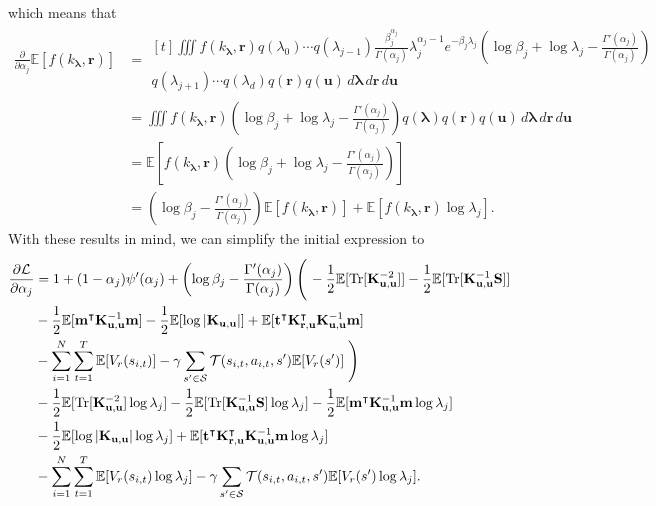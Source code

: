 \documentclass{article}
\theoremstyle{definition}
\DeclareMathOperator{\Tr}{Tr}
\newcommand{\Kuu}{\mathbf{K}_{\mathbf{u},\mathbf{u}}}
\newcommand{\Kru}{\mathbf{K}_{\mathbf{r},\mathbf{u}}}
\newcommand{\da}{\frac{\partial}{\partial\alpha_j}}
\begin{document}
which means that
\[
  \begin{split}
    \da\mathbb{E}[f(k_{\bm\lambda}, \mathbf{r})] &= \!\begin{multlined}[t]
      \iiint f(k_{\bm\lambda}, \mathbf{r}) q(\lambda_0) \cdots q(\lambda_{j-1})
      \frac{\beta_j^{\alpha_j}}{\Gamma(\alpha_j)}\lambda_j^{\alpha_j -
        1}e^{-\beta_j\lambda_j} \left(\log\beta_j + \log\lambda_j -
        \frac{\Gamma'(\alpha_j)}{\Gamma(\alpha_j)} \right) \\
      q(\lambda_{j+1}) \cdots q(\lambda_d)
      q(\mathbf{r})q(\mathbf{u})\,d\bm\lambda\,d\mathbf{r}\,d\mathbf{u}
    \end{multlined} \\
    &= \iiint f(k_{\bm\lambda}, \mathbf{r}) \left(\log\beta_j + \log\lambda_j -
      \frac{\Gamma'(\alpha_j)}{\Gamma(\alpha_j)} \right) q(\bm\lambda)
    q(\mathbf{r})q(\mathbf{u})\,d\bm\lambda\,d\mathbf{r}\,d\mathbf{u} \\
    &= \mathbb{E} \left[ f(k_{\bm\lambda}, \mathbf{r}) \left(\log\beta_j +
        \log\lambda_j - \frac{\Gamma'(\alpha_j)}{\Gamma(\alpha_j)} \right)
    \right] \\
    &= \left( \log\beta_j - \frac{\Gamma'(\alpha_j)}{\Gamma(\alpha_j)}
    \right)\mathbb{E}[f(k_{\bm\lambda}, \mathbf{r})] +
    \mathbb{E}[f(k_{\bm\lambda}, \mathbf{r})\log\lambda_j].
  \end{split}
\]
With these results in mind, we can simplify the initial expression to
\[
  \begin{split}
    \frac{\partial\mathcal{L}}{\partial\alpha_j} &= 1 + (1 -
    \alpha_j)\psi'(\alpha_j) + \left( \log\beta_j -
      \frac{\Gamma'(\alpha_j)}{\Gamma(\alpha_j)} \right)
    \left(\vphantom{\sum_{i=1}^N} \right. - \frac{1}{2}
    \mathbb{E}[\Tr[\Kuu^{-2}]] - \frac{1}{2}\mathbb{E}[\Tr[\Kuu^{-1}\mathbf{S}]]
    \\
    &- \frac{1}{2}\mathbb{E}[\mathbf{m}^\intercal\Kuu^{-1}\mathbf{m}] -
    \frac{1}{2}\mathbb{E}[\log|\Kuu|] +
    \mathbb{E}[\mathbf{t}^\intercal\Kru^\intercal\Kuu^{-1}\mathbf{m}] \\
    &- \sum_{i=1}^N \sum_{t=1}^T \mathbb{E}[V_r(s_{i,t})] - \gamma\sum_{s' \in
      \mathcal{S}} \mathcal{T}(s_{i,t}, a_{i,t}, s')\mathbb{E}[V_r(s')] \left.
      \vphantom{\sum_{i=1}^N} \right) \\
    & - \frac{1}{2}\mathbb{E}[\Tr[\Kuu^{-2}]\log\lambda_j] -
    \frac{1}{2}\mathbb{E}[\Tr[\Kuu^{-1}\mathbf{S}]\log\lambda_j] -
    \frac{1}{2}\mathbb{E}[\mathbf{m}^\intercal\Kuu^{-1}\mathbf{m}\log\lambda_j]
    \\
    &- \frac{1}{2}\mathbb{E}[\log|\Kuu|\log\lambda_j] +
    \mathbb{E}[\mathbf{t}^\intercal\Kru^\intercal\Kuu^{-1}\mathbf{m}\log\lambda_j]
    \\
    &- \sum_{i=1}^N\sum_{t=1}^T\mathbb{E}[V_r(s_{i,t})\log\lambda_j] -
    \gamma\sum_{s' \in \mathcal{S}}\mathcal{T}(s_{i,t}, a_{i,t},
    s')\mathbb{E}[V_r(s')\log\lambda_j].
  \end{split}
\]
\end{document}
